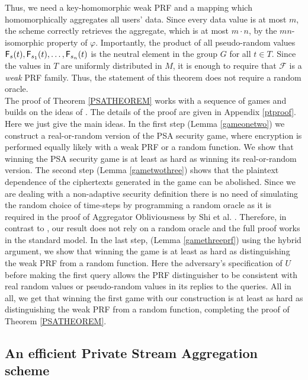 \documentclass[10pt]{extarticle}
\begin{document}
Thus, we need a key-homomorphic weak PRF and a mapping which homomorphically aggregates all users' data. Since every data value is at most $m$, the scheme correctly retrieves the aggregate, which is at most $m\cdot n$, by the $mn$-isomorphic property of $\varphi$. Importantly, the product of all pseudo-random values $\text{\upshape\sffamily F}_s(t),\text{\upshape\sffamily F}_{s_1}(t),\ldots,\text{\upshape\sffamily F}_{s_n}(t)$ is the neutral element in the group $G$ for all $t\in T$. Since the values in $T$ are uniformly distributed in $M$, it is enough to require that $\mathcal{F}$ is a \textit{weak} PRF family. Thus, the statement of this theorem does not require a random oracle.\\
The proof of Theorem \ref{PSATHEOREM} works with a sequence of games and builds on the ideas of \cite{2}. The details of the proof are given in Appendix \ref{ptproof}. 
Here we just give the main ideas. In the first step (Lemma \ref{gameonetwo}) 
we construct a real-or-random version of the PSA security game, where encryption is performed equally likely with a weak PRF or a random function. We show that winning the PSA security game is at least as hard as winning its real-or-random version. The second step (Lemma \ref{gametwothree}) 
shows that the plaintext dependence of the ciphertexts generated in the game can be abolished. Since we are dealing with a non-adaptive security definition there is no need of simulating the random choice of time-steps by programming a random oracle as it is required in the proof of Aggregator Obliviousness by Shi et al. \cite{2}. Therefore, in contrast to \cite{2}, our result does not rely on a random oracle and the full proof works in the standard model. In the last step, (Lemma \ref{gamethreeprf})
using the hybrid argument, we show that winning the game is at least as hard as distinguishing the weak PRF from a random function. Here the adversary's specification of $U$ before making the first query allows the PRF distinguisher to be consistent with real random values or pseudo-random values in its replies to the queries. All in all, we get that winning the first game with our construction is at least as hard as distinguishing the weak PRF from a random function, completing the proof of Theorem \ref{PSATHEOREM}.

\subsection{An efficient Private Stream Aggregation scheme}
\end{document}
